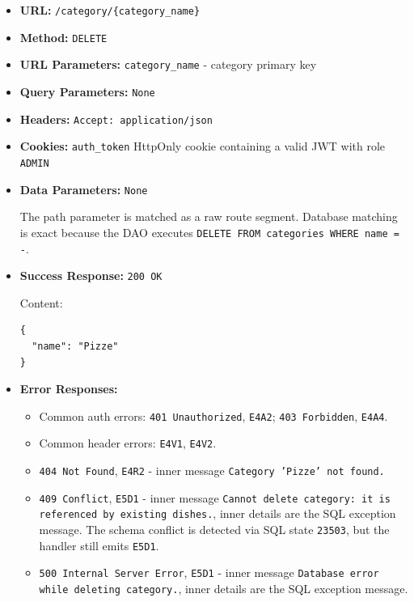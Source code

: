 \begin{itemize}[nosep]
\item \textbf{URL:} \texttt{/category/\{category\_name\}}

\item \textbf{Method:} \texttt{DELETE}

\item \textbf{URL Parameters:} \texttt{category\_name} - category primary key

\item \textbf{Query Parameters:} \texttt{None}

\item \textbf{Headers:} \texttt{Accept: application/json}

\item \textbf{Cookies:} \texttt{auth\_token} HttpOnly cookie containing a valid JWT with role \texttt{ADMIN}

\item \textbf{Data Parameters:} \texttt{None}

The path parameter is matched as a raw route segment. Database matching is exact because the DAO executes \texttt{DELETE FROM categories WHERE name = -}.

\item \textbf{Success Response:} \texttt{200 OK}

Content:

\begin{lstlisting}
{
  "name": "Pizze"
}
\end{lstlisting}

\item \textbf{Error Responses:}

\begin{itemize}[nosep]
\item Common auth errors: \texttt{401 Unauthorized}, \texttt{E4A2}; \texttt{403 Forbidden}, \texttt{E4A4}.
\item Common header errors: \texttt{E4V1}, \texttt{E4V2}.
\item \texttt{404 Not Found}, \texttt{E4R2} - inner message \texttt{Category 'Pizze' not found.}
\item \texttt{409 Conflict}, \texttt{E5D1} - inner message \texttt{Cannot delete category: it is referenced by existing dishes.}, inner details are the SQL exception message. The schema conflict is detected via SQL state \texttt{23503}, but the handler still emits \texttt{E5D1}.
\item \texttt{500 Internal Server Error}, \texttt{E5D1} - inner message \texttt{Database error while deleting category.}, inner details are the SQL exception message.
\end{itemize}

\end{itemize}

